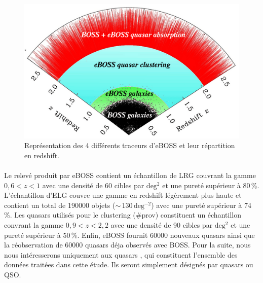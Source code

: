 \documentclass[11pt, twoside, a4paper, openright]{report}
\begin{document}
\begin{figure}
  \centering
  \includegraphics[scale=0.5]{../img/eBOSS/eBOSStracers}
  \caption{Représentation des 4 différents traceurs d'eBOSS et leur r\'epartition en redshift.}
  \label{fig:eBOSStracers}
\end{figure}
\paragraph{}
Le relevé produit par eBOSS contient un échantillon de LRG couvrant la gamme $0,6 < z < 1$ avec une densité de 60 cibles par $\mathrm{deg^{2}}$ et une pureté supérieur à 80\,\%. L'échantillon d'ELG couvre une gamme en redshift légèrement plus haute et contient un total de \num{190000} objets ($\sim\,130\,\mathrm{deg^{-2}}$) avec une pureté supérieur à 74\,\%. Les quasars utilisés pour le clustering (\#prov) constituent un échantillon convrant la gamme $0,9 < z < 2,2$ avec une densité de 90 cibles par $\mathrm{deg^{2}}$ et une pureté supérieur à 50\,\%. Enfin, eBOSS fournit \num{60000} nouveaux quasars \lya{} ainsi que la réobservation de \num{60000} quasars \lya{} déja observés avec BOSS. Pour la suite, nous nous intéresserons uniquement aux quasars \lya{}, qui constituent l'ensemble des données traitées dans cette étude. Ils seront simplement désignés par quasars ou QSO.


\end{document}
